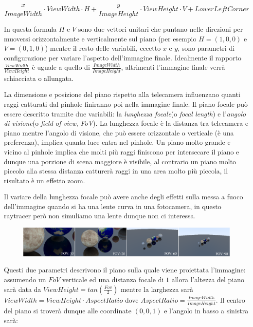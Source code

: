\documentclass[12pt, twoside]{article}
\begin{document}
$$
  \frac{x}{ImageWidth} \cdot ViewWidth \cdot H + \frac{y}{ImageHeight} \cdot ViewHeight \cdot V + LowerLeftCorner
$$

In questa formula $H$ e $V$ sono due vettori unitari che puntano nelle
direzioni per muoversi orizzontalmente e verticalmente sul piano
(per esempio $H=(1, 0, 0)$ e $V=(0, 1, 0)$) mentre il resto delle variabili,
eccetto $x$ e $y$, sono parametri di configurazione per variare l'aspetto
dell'immagine finale.
Idealmente il rapporto $\frac{ViewWidth}{ViewHeight}$ è uguale a quello di
$\frac{ImageWidth}{ImageHeight}$, altrimenti l'immagine finale verrà
schiacciata o allungata.

\bigbreak

La dimensione e posizione del piano rispetto alla telecamera influenzano
quanti raggi catturati dal pinhole finiranno poi nella immagine finale.
Il piano focale può essere descritto tramite due variabili: la
\textit{lunghezza focale}(o \textit{focal length}) e
l'\textit{angolo di visione}(o \textit{field of view}, \textit{FoV}).
La lunghezza focale è la distanza tra telecamera e piano
mentre l'angolo di visione, che può essere orizzontale o verticale (è una
preferenza), implica quanta luce entra nel pinhole.
Un piano molto grande e vicino al pinhole implica che molti più raggi finiscono
per intersecare il piano e dunque una porzione di scena maggiore è visibile,
al contrario un piano molto piccolo alla stessa distanza catturerà raggi in
una area molto più piccola, il risultato è un effetto zoom.

Il variare della lunghezza focale può avere anche degli effetti sulla messa
a fuoco dell'immagine quando si ha una lente curva in una fotocamera, in questo
raytracer però non simuliamo una lente dunque non ci interessa.

\begin{figure}[h]
  \centering
  \includegraphics[width=\linewidth,keepaspectratio]{images/fov_changes.png}
\end{figure}

Questi due parametri descrivono il piano sulla quale viene proiettata
l'immagine:
assumendo un $FoV$ verticale ed una distanza focale di $1$ allora l'altezza
del piano sarà data da $ViewHeight = tan(\frac{Fov}{2})$ mentre la larghezza
sarà $ViewWidth = ViewHeight \cdot AspectRatio$ dove
$AspectRatio = \frac{ImageWidth}{ImageHeight}$.
Il centro del piano si troverà dunque alle coordinate
$(0, 0, 1)$ e l'angolo in basso a sinistra sarà:
\end{document}
